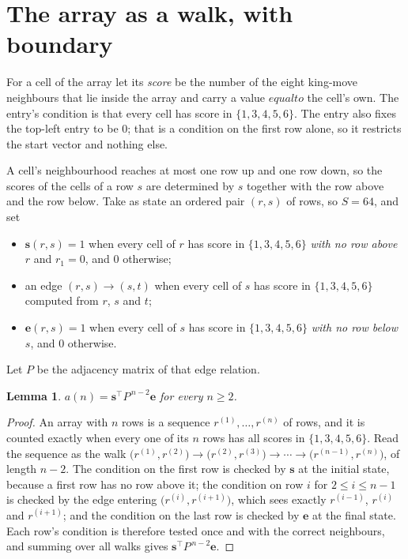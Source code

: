 \documentclass[11pt,a4paper]{article}
\theoremstyle{plain}
\newtheorem{lemma}[theorem]{Lemma}
\theoremstyle{definition}
\begin{document}
\section{The array as a walk, with boundary}

For a cell of the array let its \emph{score} be the number of the eight king-move neighbours that lie inside
the array and carry a value $equal to$ the cell's own. The entry's condition is that every cell
has score in $\{1,3,4,5,6\}$. The entry also fixes the top-left entry to be $0$; that is a condition on the first row alone, so it restricts the start vector and nothing else.

A cell's neighbourhood reaches at most one row up and one row down, so the scores of the
cells of a row $s$ are determined by $s$ together with the row above and the row below.
Take as state an ordered pair $(r,s)$ of rows, so $S=64$, and set
\begin{itemize}
\item $\mathbf{s}(r,s)=1$ when every cell of $r$ has score in $\{1,3,4,5,6\}$ \emph{with no row
above $r$} and $r_1=0$, and $0$ otherwise;
\item an edge $(r,s)\to(s,t)$ when every cell of $s$ has score in $\{1,3,4,5,6\}$ computed from
$r$, $s$ and $t$;
\item $\mathbf{e}(r,s)=1$ when every cell of $s$ has score in $\{1,3,4,5,6\}$ \emph{with no row
below $s$}, and $0$ otherwise.
\end{itemize}
Let $P$ be the adjacency matrix of that edge relation.

\begin{lemma}\label{lem:walk}
$a(n)=\mathbf{s}^{\!\top}P^{\,n-2}\mathbf{e}$ for every $n\ge2$.
\end{lemma}

\begin{proof}
An array with $n$ rows is a sequence $r^{(1)},\dots,r^{(n)}$ of rows, and it is counted
exactly when every one of its $n$ rows has all scores in $\{1,3,4,5,6\}$. Read the sequence as the
walk $\bigl(r^{(1)},r^{(2)}\bigr)\to\bigl(r^{(2)},r^{(3)}\bigr)\to\cdots\to
\bigl(r^{(n-1)},r^{(n)}\bigr)$, of length $n-2$. The condition on the first row is
checked by $\mathbf{s}$ at the initial state, because a first row has no row above it; the
condition on row $i$ for $2\le i\le n-1$ is checked by the edge entering
$\bigl(r^{(i)},r^{(i+1)}\bigr)$, which sees exactly $r^{(i-1)}$, $r^{(i)}$ and
$r^{(i+1)}$; and the condition on the last row is checked by $\mathbf{e}$ at the final
state. Each row's condition is therefore tested once and with the correct neighbours, and
summing over all walks gives $\mathbf{s}^{\!\top}P^{\,n-2}\mathbf{e}$.
\end{proof}
\end{document}
